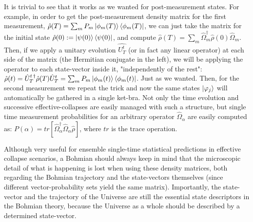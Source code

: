 \documentclass[11pt, a4paper]{article} %
\begin{document}
It is trivial to see that it works as we wanted for post-measurement states. For example, in order to get the post-measurement density matrix for the first measurement, $\hat{\rho}(T) = \sum_m P_m\ket{\phi_m(T)}\bra{\phi_m(T)}$, we can just take the matrix for the initial state $\hat{\rho}(0):=\ket{\psi(0)}\bra{\psi(0)}$, and compute $\hat{\rho}(T)=\sum_m \hat{\Omega}_m^\dagger\hat{\rho}(0)\hat{\Omega}_m$. Then, if we apply a unitary evolution $\hat{U_T^t}$ (or in fact any linear operator) at each side of the matrix (the Hermitian conjugate in the left), we will be applying the operator to each state-vector inside it, "independently of the rest": $\hat{\rho}(t)=\hat{U}_T^{t\,\dagger}\hat{\rho}(T)\hat{U}_T^{t}=\sum_m P_m\ket{\phi_m(t)}\bra{\phi_m(t)}$. Just as we wanted. Then, for the second measurement we repeat the trick and now the same states $\ket{\varphi_j}$ will automatically be gathered in a single ket-bra. Not only the time evolution and successive effective-collapses are easily managed with such a structure, but single time measurement probabilities for an arbitrary operator $\hat{\Omega}_\alpha$ are easily computed as: $P(\alpha)=tr[\hat{\Omega}_\alpha^\dagger \hat{\Omega}_\alpha\hat{\rho}]$, where $tr$ is the trace operation.

Although very useful for ensemble single-time statistical predictions in effective collapse scenarios, a Bohmian should always keep in mind that the microscopic detail of what is happening is lost when using these density matrices, both regarding the Bohmian trajectory and the state-vectors themselves (since different vector-probability sets yield the same matrix). Importantly, the state-vector and the trajectory of the Universe are still the essential state descriptors in the Bohmian theory, because the Universe as a whole should be described by a determined state-vector.
\end{document}
